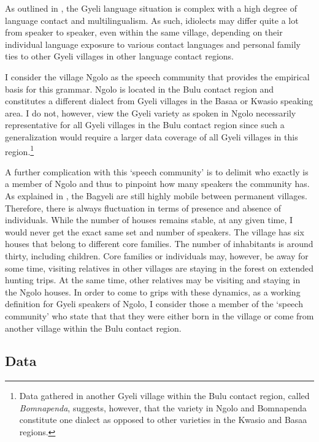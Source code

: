 As outlined in , the Gyeli language situation is complex with a high degree of language contact and multilingualism. As such, idiolects may differ quite a lot from speaker to speaker, even within the same village, depending on their individual language exposure to various contact languages and personal family ties to other Gyeli villages in other language contact regions.

I consider the village Ngolo as the speech community that provides the empirical basis for this grammar. Ngolo is located in the Bulu contact region and constitutes a different dialect from Gyeli villages in the Basaa or Kwasio speaking area. I do not, however, view the Gyeli variety as spoken in Ngolo necessarily representative for all Gyeli villages in the Bulu contact region since such a generalization would require a larger data coverage of all Gyeli villages in this region.\footnote{Data gathered in another Gyeli village within the Bulu contact region, called {\itshape Bomnapenda}, suggests, however, that the variety in Ngolo and Bomnapenda constitute one dialect as opposed to other varieties in the Kwasio and Basaa regions.}

A further complication with this `speech community' is to delimit who exactly is a member of Ngolo and thus to pinpoint how many speakers the community has. As explained in , the Bagyeli are still highly mobile between permanent villages. Therefore, there is always fluctuation in terms of presence and absence of individuals. While the number of houses remains stable, at any given time, I would never get the exact same set and number of speakers. The village has six houses that belong to different core families. The number of inhabitants is around thirty, including children. Core families or individuals may, however, be away for some time, visiting relatives in other villages are staying in the forest on extended hunting trips. At the same time, other relatives may be visiting and staying in the Ngolo houses.  
In order to come to grips with these dynamics,  as a working definition for Gyeli speakers of Ngolo, I consider those a member of the `speech community' who state that that they were either born in the village or come from another village within the Bulu contact region. 



\subsection{Data}
\label{sec:Data}

